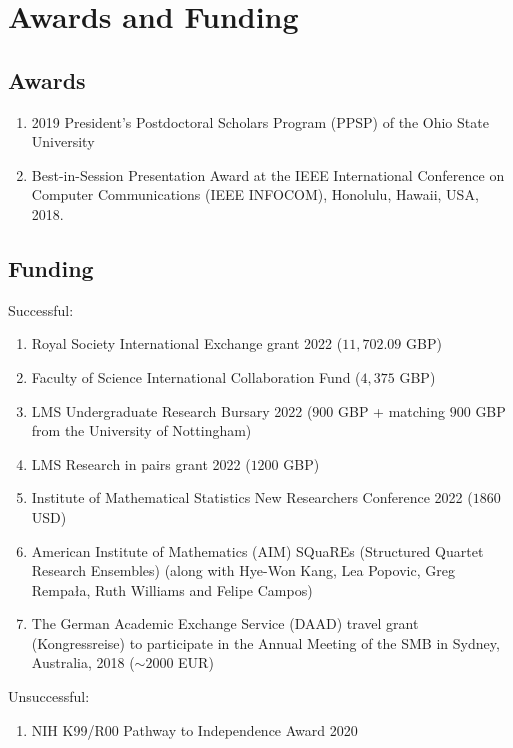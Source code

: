 \documentclass[11pt,a4paper,sans]{moderncv}        %
\begin{document}
\section{Awards and Funding}
\subsection{Awards}
\begin{enumerate}
\item{2019 President’s Postdoctoral Scholars Program (PPSP) of the Ohio State University}
\item{Best-in-Session Presentation Award at the IEEE International Conference on Computer Communications (IEEE INFOCOM), Honolulu, Hawaii, USA, 2018.}
\end{enumerate}


\subsection{Funding}
Successful: 
\begin{enumerate}
	\item Royal Society International Exchange grant 2022 ($11,702.09$ GBP)
	\item Faculty of Science International Collaboration Fund ($4,375$ GBP)
	\item LMS Undergraduate Research Bursary 2022 ($900$ GBP + matching $900$ GBP from the University of Nottingham)
	\item LMS Research in pairs grant 2022 ($1200 $ GBP)
	\item Institute of Mathematical Statistics New Researchers Conference 2022 ($1860$ USD)
	\item American Institute of Mathematics (AIM) SQuaREs (Structured Quartet Research Ensembles) (along with Hye-Won Kang, Lea Popovic, Greg Rempa{\l}a, Ruth Williams and Felipe Campos)
	\item {The  German Academic Exchange Service (DAAD) travel grant (Kongressreise) to participate in the Annual Meeting of the SMB in Sydney, Australia, 2018 ($\sim 2000$ EUR)}
\end{enumerate}

Unsuccessful:
\begin{enumerate}
	\item NIH K99/R00 Pathway to Independence Award 2020 
\end{enumerate}
\end{document}
